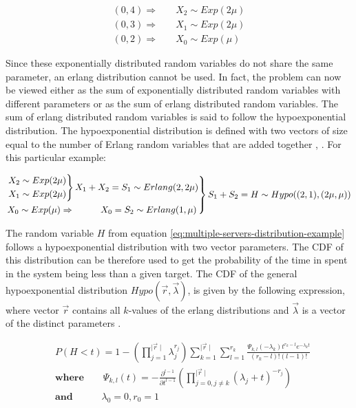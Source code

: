 \begin{align}
    (0,4) \Rightarrow \quad & X_2 \sim Exp(2\mu) \nonumber \\
    (0,3) \Rightarrow \quad & X_1 \sim Exp(2\mu) \\
    (0,2) \Rightarrow \quad & X_0 \sim Exp(\mu) \nonumber
\end{align}

Since these exponentially distributed random variables do not share the same 
parameter, an erlang distribution cannot be used. 
In fact, the problem can now be viewed either as the sum of exponentially 
distributed random variables with different parameters or as the sum of 
erlang distributed random variables.
The sum of erlang distributed random variables is said to follow the 
hypoexponential distribution. 
The hypoexponential distribution is defined with two vectors of size equal
to the number of Erlang random variables that are added together
\cite{Akkouchi2008}, \cite{Smaili2013}. 
For this particular example:

\begin{align} \label{eq:multiple-servers-distribution-example}
    \begin{rcases}
        \begin{rcases}
            X_2 \sim Exp(2\mu) \\
            X_1 \sim Exp(2\mu)
        \end{rcases}
        X_1 + X_2 = S_1 \sim Erlang(2, 2\mu) \\
        X_0 \sim Exp(\mu) \Rightarrow \hspace{1cm} X_0 = S_2 \sim Erlang(1, \mu)
    \end{rcases}
    S_1 + S_2 = H \sim Hypo((2,1), (2\mu, \mu)) 
\end{align}

The random variable \(H\) from equation 
\ref{eq:multiple-servers-distribution-example} follows a hypoexponential 
distribution with two vector parameters. 
The CDF of this distribution can be therefore used to get the probability of the 
time in spent in the system being less than a given target.
The CDF of the general hypoexponential distribution \(Hypo(\vec{r}, 
\vec{\lambda})\), is given by the following expression, where vector \(\vec{r}\) 
contains all \(k\)-values of the erlang distributions and \(\vec{\lambda}\) 
is a vector of the distinct parameters \cite{Favaro2010}.

\begin{align} \label{eq:general-cdf-hypoexponential}
    & P(H < t) = 1 - \left( \prod_{j=1}^{\mid \vec{r} \mid} \lambda_j^{r_j} \right) 
    \sum_{k=1}^{\mid \vec{r} \mid} \sum_{l=1}^{r_k} \frac{\Psi_{k,l}(-\lambda_k)t^{r_k - l} 
    e^{-\lambda_k t}}
    {(r_k - l)! (l - 1)!} \nonumber \\ 
    & \textbf{where} \qquad \Psi_{k,l}(t) = - \frac{\partial^{l - 1}}
    {\partial t ^{l - 1}} \left( \prod_{j = 0, j \neq k}^{\mid \vec{r} \mid} 
    (\lambda_j + t)^{-r_j} \right) \nonumber \\
    & \textbf{and} \quad \qquad \lambda_0 = 0, r_0 = 1
\end{align}



